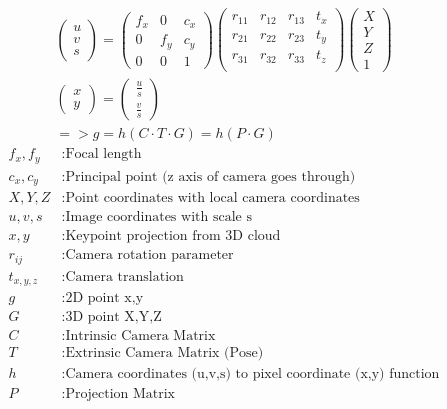 \documentclass[11pt,a4paper,titlepage,oneside]{report}
\begin{document}
\begin{equation}\label{eq:camera_model}
  \begin{gathered}
    \begin{pmatrix}
      u\\
      v\\
      s
    \end{pmatrix}=
    \begin{pmatrix}
      f_x & 0 & c_x \\
      0 & f_y & c_y \\
      0 & 0 & 1
    \end{pmatrix}
    \begin{pmatrix}
      r_{11} & r_{12} & r_{13} & t_x\\
      r_{21} & r_{22} & r_{23} & t_y\\
      r_{31} & r_{32} & r_{33} & t_z\\
    \end{pmatrix}
    \begin{pmatrix}
      X\\
      Y\\
      Z\\
      1
    \end{pmatrix}\\
    \begin{pmatrix}
      x\\
      y
    \end{pmatrix}=
    \begin{pmatrix}
      \frac{u}{s}\\
      \frac{v}{s}
    \end{pmatrix}\\
    =>g=h(C \cdot T \cdot G)=h(P \cdot G)
  \end{gathered}
\end{equation}
\begin{align*}
  f_x,f_y  &:  \text{Focal length}\\
  c_x,c_y  &:  \text{Principal point (z axis of camera goes through)}\\
  X,Y,Z     &: \text{Point coordinates with local camera coordinates}\\
  u,v,s     &: \text{Image coordinates with scale s}\\
  x,y       &: \text{Keypoint projection from 3D cloud}\\
  r_{ij}    &: \text{Camera rotation parameter}\\
  t_{x,y,z} &: \text{Camera translation}\\
  g         &: \text{2D point x,y}\\
  G         &: \text{3D point X,Y,Z}\\
  C         &: \text{Intrinsic Camera Matrix}\\
  T         &: \text{Extrinsic Camera Matrix (Pose)}\\
  h         &: \text{Camera coordinates (u,v,s) to pixel coordinate (x,y) function}\\
  P         &: \text{Projection Matrix}
\end{align*}
\end{document}

